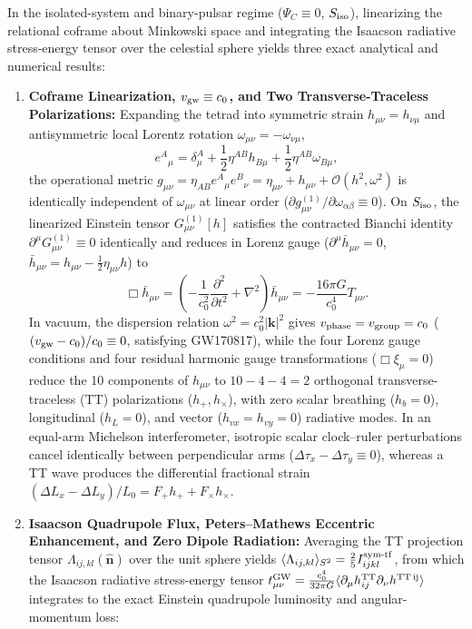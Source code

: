 \documentclass[11pt,a4paper]{article}
\begin{document}
In the isolated-system and binary-pulsar regime ($\Psi_C \equiv 0$, $S_{\rm iso}$), linearizing the relational coframe about Minkowski space and integrating the Isaacson radiative stress-energy tensor over the celestial sphere yields three exact analytical and numerical results:
\begin{enumerate}[label=\arabic*.]
\item \textbf{Coframe Linearization, $v_{\rm gw} \equiv c_0$, and Two Transverse-Traceless Polarizations:} Expanding the tetrad into symmetric strain $h_{\mu\nu} = h_{\nu\mu}$ and antisymmetric local Lorentz rotation $\omega_{\mu\nu} = -\omega_{\nu\mu}$,
\begin{equation}
e^A{}_\mu = \delta^A_\mu + \frac{1}{2}\eta^{AB}h_{B\mu} + \frac{1}{2}\eta^{AB}\omega_{B\mu},
\end{equation}
the operational metric $g_{\mu\nu} = \eta_{AB}e^A{}_\mu e^B{}_\nu = \eta_{\mu\nu} + h_{\mu\nu} + \mathcal{O}(h^2,\omega^2)$ is identically independent of $\omega_{\mu\nu}$ at linear order ($\partial g^{(1)}_{\mu\nu}/\partial\omega_{\alpha\beta} \equiv 0$). On $S_{\rm iso}$, the linearized Einstein tensor $G^{(1)}_{\mu\nu}[h]$ satisfies the contracted Bianchi identity $\partial^\mu G^{(1)}_{\mu\nu} \equiv 0$ identically and reduces in Lorenz gauge ($\partial^\mu\bar{h}_{\mu\nu} = 0$, $\bar{h}_{\mu\nu} = h_{\mu\nu} - \frac{1}{2}\eta_{\mu\nu}h$) to
\begin{equation}
\Box\bar{h}_{\mu\nu} = \left(-\frac{1}{c_0^2}\frac{\partial^2}{\partial t^2} + \nabla^2\right)\bar{h}_{\mu\nu} = -\frac{16\pi G}{c_0^4}T_{\mu\nu}.
\end{equation}
In vacuum, the dispersion relation $\omega^2 = c_0^2|\mathbf{k}|^2$ gives $v_{\rm phase} = v_{\rm group} = c_0$ ($(v_{\rm gw}-c_0)/c_0 \equiv 0$, satisfying GW170817), while the four Lorenz gauge conditions and four residual harmonic gauge transformations ($\Box\xi_\mu = 0$) reduce the 10 components of $h_{\mu\nu}$ to $10 - 4 - 4 = 2$ orthogonal transverse-traceless (TT) polarizations ($h_+, h_\times$), with zero scalar breathing ($h_b = 0$), longitudinal ($h_L = 0$), and vector ($h_{vx} = h_{vy} = 0$) radiative modes. In an equal-arm Michelson interferometer, isotropic scalar clock--ruler perturbations cancel identically between perpendicular arms ($\Delta\tau_x - \Delta\tau_y \equiv 0$), whereas a TT wave produces the differential fractional strain $(\Delta L_x - \Delta L_y)/L_0 = F_+ h_+ + F_\times h_\times$.
\item \textbf{Isaacson Quadrupole Flux, Peters--Mathews Eccentric Enhancement, and Zero Dipole Radiation:} Averaging the TT projection tensor $\Lambda_{ij,kl}(\hat{\mathbf{n}})$ over the unit sphere yields $\langle\Lambda_{ij,kl}\rangle_{S^2} = \frac{2}{5}I^{\rm sym\text{-}tf}_{ijkl}$, from which the Isaacson radiative stress-energy tensor $t^{\rm GW}_{\mu\nu} = \frac{c_0^4}{32\pi G}\langle\partial_\mu h^{\rm TT}_{ij}\partial_\nu h^{\rm TT\,ij}\rangle$ integrates to the exact Einstein quadrupole luminosity and angular-momentum loss:

\end{enumerate}
\end{document}
